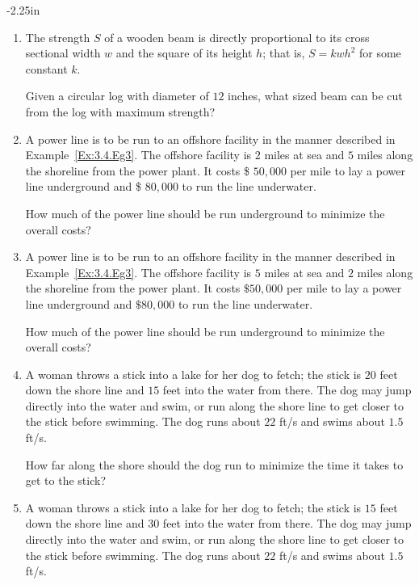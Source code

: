 \begin{adjustwidth*}{}{-2.25in}
\begin{multicols*}{2}
\begin{enumerate}[1),resume]
\item The strength $S$ of a wooden beam is directly proportional to its cross sectional  width $w$ and the square of its height $h$; that is, $S = kwh^2$ for some constant $k$. 

\noindent\begin{minipage}{\linewidth}
\centering
{}
\end{minipage}

Given a circular log with diameter of $12$ inches, what sized beam can be cut from the log with maximum strength?

\item A power line is to be run to an offshore facility in the manner described in Example~\ref{Ex:3.4.Eg3}. The offshore facility is $2$ miles at sea and $5$ miles along the shoreline from the power plant. It costs \$ $50,000$ per mile to lay a power line underground and \$ $80,000$ to run the line underwater. 

How much of the power line should be run underground to minimize the overall costs?
\item A power line is to be run to an offshore facility in the manner described in Example~\ref{Ex:3.4.Eg3}. The offshore facility is $5$ miles at sea and $2$ miles along the shoreline from the power plant. It costs $\$50,000$ per mile to lay a power line underground and $\$80,000$ to run the line underwater. 

How much of the power line should be run underground to minimize the overall costs?

\item A woman throws a stick into a lake for her dog to fetch; the stick is $20$ feet down the shore line and $15$ feet into the water from there. The dog may jump directly into the water and swim, or run along the shore line to get closer to the stick before swimming. The dog runs about $22$ ft/s and swims about $1.5$ ft/s. 

How far along the shore should the dog run to minimize the time it takes to get to the stick?

\item A woman throws a stick into a lake for her dog to fetch; the stick is $15$ feet down the shore line and $30$ feet into the water from there. The dog may jump directly into the water and swim, or run along the shore line to get closer to the stick before swimming. The dog runs about $22$ ft/s and swims about $1.5$ ft/s. 


\end{enumerate}
\end{multicols*}
\end{adjustwidth*}
